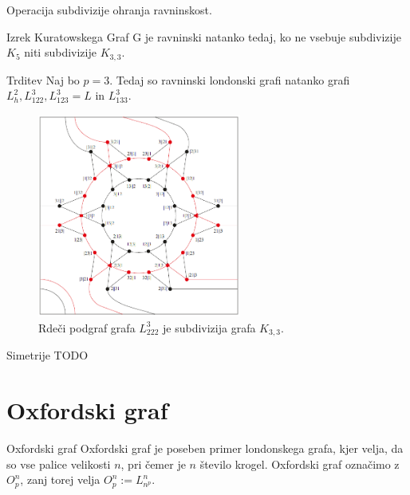 \documentclass[dvipsnames]{beamer}
\begin{document}
\begin{frame}
    Operacija \alert{subdivizije} ohranja ravninskost.
    \begin{block}{Izrek Kuratowskega}
           	Graf G je ravninski natanko tedaj, ko ne vsebuje subdivizije $K_5$ niti subdivizije $K_{3,3}$.
    \end{block}

    \begin{block}{Trditev}
           	Naj bo $p=3$. Tedaj so ravninski londonski grafi natanko grafi $L_h^2, L_{122}^3,L_{123}^3 = L$ in $ L_{133}^3$.
    \end{block}

\end{frame}

\begin{frame}
    \begin{figure}[h]
        \includegraphics[width=190pt]{../img/tolgraph-O^3_222-subdivision.png}
        \caption{Rdeči podgraf grafa $L_{222}^3$ je subdivizija grafa $K_{3,3}$.}
    \end{figure}
\end{frame}

\begin{frame}{Simetrije}
    TODO
\end{frame}

\section{Oxfordski graf}
\begin{frame}{Oxfordski graf}
    \alert{Oxfordski graf} je poseben primer londonskega grafa, kjer velja, da so vse palice velikosti $n$, pri čemer je $n$ število krogel. Oxfordski graf označimo z $O^n_p$, zanj torej velja $O^n_p := L^n_{n^p}$.
    
\end{frame}
\end{document}
